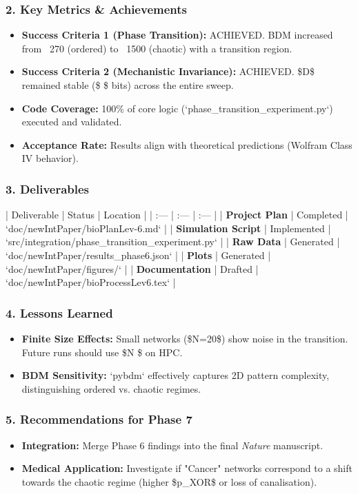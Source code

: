 \documentclass{article}
\begin{document}
\subsubsection{2. Key Metrics \& Achievements}
\begin{itemize}
\item   \textbf{Success Criteria 1 (Phase Transition):} ACHIEVED. BDM increased from ~270 (ordered) to ~1500 (chaotic) with a transition region.
\item   \textbf{Success Criteria 2 (Mechanistic Invariance):} ACHIEVED. \$D\$ remained stable (\$ \$ bits) across the entire sweep.
\item   \textbf{Code Coverage:} 100\% of core logic (`phase\_transition\_experiment.py`) executed and validated.
\item   \textbf{Acceptance Rate:} Results align with theoretical predictions (Wolfram Class IV behavior).
\end{itemize}

\subsubsection{3. Deliverables}
| Deliverable | Status | Location |
| :--- | :--- | :--- |
| \textbf{Project Plan} | Completed | `doc/newIntPaper/bioPlanLev-6.md` |
| \textbf{Simulation Script} | Implemented | `src/integration/phase\_transition\_experiment.py` |
| \textbf{Raw Data} | Generated | `doc/newIntPaper/results\_phase6.json` |
| \textbf{Plots} | Generated | `doc/newIntPaper/figures/` |
| \textbf{Documentation} | Drafted | `doc/newIntPaper/bioProcessLev6.tex` |

\subsubsection{4. Lessons Learned}
\begin{itemize}
\item   \textbf{Finite Size Effects:} Small networks (\$N=20\$) show noise in the transition. Future runs should use \$N \$ on HPC.
\item   \textbf{BDM Sensitivity:} `pybdm` effectively captures 2D pattern complexity, distinguishing ordered vs. chaotic regimes.
\end{itemize}

\subsubsection{5. Recommendations for Phase 7}
\begin{itemize}
\item   \textbf{Integration:} Merge Phase 6 findings into the final \textit{Nature} manuscript.
\item   \textbf{Medical Application:} Investigate if "Cancer" networks correspond to a shift towards the chaotic regime (higher \$p\_{XOR}\$ or loss of canalisation).
\end{itemize}
\end{document}
